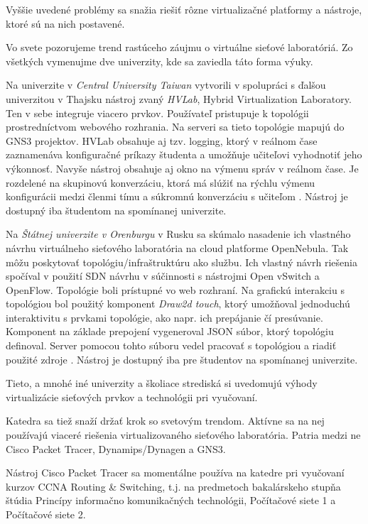 Vyššie uvedené problémy sa snažia riešiť rôzne virtualizačné platformy a nástroje, ktoré sú na nich postavené.

Vo svete pozorujeme trend rastúceho záujmu o virtuálne sieťové laboratóriá. Zo všetkých vymenujme dve univerzity, kde sa zaviedla táto forma výuky.

Na univerzite v \emph{Central University Taiwan} vytvorili v spolupráci s ďalšou univerzitou v Thajsku nástroj zvaný \emph{HVLab}, Hybrid Virtualization Laboratory. Ten v sebe integruje viacero prvkov. Používateľ pristupuje k topológii prostredníctvom webového rozhrania. Na serveri sa tieto topológie mapujú do GNS3 projektov. HVLab obsahuje aj tzv. logging, ktorý v reálnom čase zaznamenáva konfiguračné príkazy študenta a umožňuje učiteľovi vyhodnotiť jeho výkonnosť. Navyše nástroj obsahuje aj okno na výmenu správ v reálnom čase. Je rozdelené na skupinovú konverzáciu, ktorá má slúžiť na rýchlu výmenu konfigurácii medzi členmi tímu a súkromnú konverzáciu s učiteľom \cite{hvlab}. Nástroj je dostupný iba študentom na spomínanej univerzite.

Na \emph{Štátnej univerzite v Orenburgu} v Rusku sa skúmalo nasadenie ich vlastného návrhu virtuálneho sieťového laboratória na cloud platforme OpenNebula. Tak môžu poskytovať topológiu/infraštruktúru ako službu. Ich vlastný návrh riešenia spočíval v použití SDN návrhu v súčinnosti s nástrojmi Open vSwitch a OpenFlow. Topológie boli prístupné vo web rozhraní. Na grafickú interakciu s topológiou bol použitý komponent \emph{Draw2d touch}, ktorý umožňoval jednoduchú interaktivitu s prvkami topológie, ako napr. ich prepájanie čí presúvanie. Komponent na základe prepojení vygeneroval JSON súbor, ktorý topológiu definoval. Server pomocou tohto súboru vedel pracovať s topológiou a riadiť použité zdroje \cite{opennebula_lab}. Nástroj je dostupný iba pre študentov na spomínanej univerzite.

Tieto, a mnohé iné univerzity a školiace strediská si uvedomujú výhody virtualizácie sieťových prvkov a technológii pri vyučovaní.

Katedra sa tiež snaží držať krok so svetovým trendom. Aktívne sa na nej používajú viaceré riešenia virtualizovaného sieťového laboratória. Patria medzi ne Cisco Packet Tracer, Dynamips/Dynagen a GNS3.

Nástroj Cisco Packet Tracer sa momentálne používa na katedre pri vyučovaní kurzov CCNA Routing \& Switching, t.j. na predmetoch bakalárskeho stupňa štúdia Princípy informačno komunikačných technológii, Počítačové siete 1 a Počítačové siete 2.

